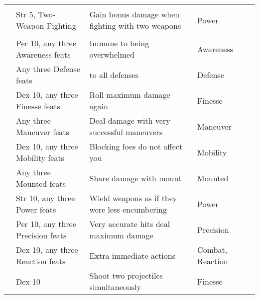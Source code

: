 \begin{longtabuwrapper}
\begin{longtabu}{>{\lcol}p{10em} >{\lcol}p{15em} >{\lcol}X >{\lcol}p{6em} >{\lcol}p{3em}}
        \midrule
         &  &  &  &  \\
         & Str 5, Two-Weapon Fighting & Gain bonus damage when fighting with two weapons & Power &  \\

        \midrule
         &  &  &  &  \\
         & Per 10, any three Awareness feats & Immune to being overwhelmed & Awareness &  \\
         & Any three Defense feats &  to all defenses & Defense &  \\
         & Dex 10, any three Finesse feats & Roll maximum damage again & Finesse &  \\
         & Any three Maneuver feats & Deal damage with very successful maneuvers & Maneuver &  \\
         & Dex 10, any three Mobility feats & Blocking foes do not affect you & Mobility&  \\
         & Any three Mounted feats & Share damage with mount & Mounted&  \\
         & Str 10, any three Power feats & Wield weapons as if they were less encumbering & Power&  \\
         & Per 10, any three Precision feats & Very accurate hits deal maximum damage & Precision &  \\
         & Dex 10, any three Reaction feats & Extra immediate actions & Combat, Reaction &  \\
         & Dex 10 & Shoot two projectiles simultaneously & Finesse &  \\


\end{longtabu}
\end{longtabuwrapper}
